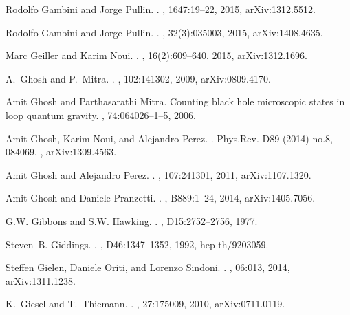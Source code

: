 \documentclass[aps, nofootinbib,superscriptaddress,12pt]{revtex4-2}
\begin{document}
\begin{thebibliography}{100}
Rodolfo Gambini and Jorge Pullin.
.
, 1647:19--22, 2015, arXiv:1312.5512.

Rodolfo Gambini and Jorge Pullin.
.
, 32(3):035003, 2015, arXiv:1408.4635.

Marc Geiller and Karim Noui.
.
, 16(2):609--640, 2015, arXiv:1312.1696.

A.~Ghosh and P.~Mitra.
.
, 102:141302, 2009, arXiv:0809.4170.

Amit Ghosh and Parthasarathi Mitra.
\newblock Counting black hole microscopic states in loop quantum gravity.
, 74:064026--1--5, 2006.

Amit Ghosh, Karim Noui, and Alejandro Perez.
.
  \newblock  Phys.Rev. D89 (2014) no.8, 084069. 
, arXiv:1309.4563.

Amit Ghosh and Alejandro Perez.
.
, 107:241301, 2011, arXiv:1107.1320.

Amit Ghosh and Daniele Pranzetti.
.
, B889:1--24, 2014, arXiv:1405.7056.

G.W. Gibbons and S.W. Hawking.
.
, D15:2752--2756, 1977.

Steven~B. Giddings.
.
, D46:1347--1352, 1992, hep-th/9203059.

Steffen Gielen, Daniele Oriti, and Lorenzo Sindoni.
.
, 06:013, 2014, arXiv:1311.1238.

K.~Giesel and T.~Thiemann.
.
, 27:175009, 2010, arXiv:0711.0119.


\end{thebibliography}
\end{document}
